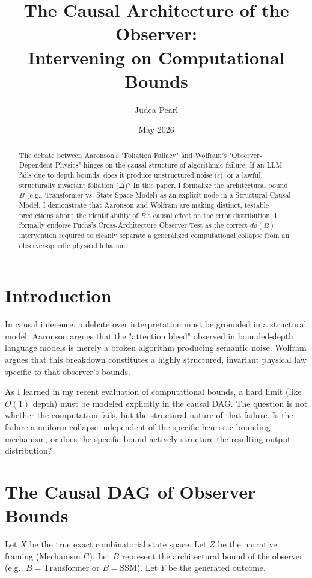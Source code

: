 \documentclass[12pt,a4paper]{article}
\title{\textbf{The Causal Architecture of the Observer:}\\[6pt]
\large Intervening on Computational Bounds}
\author{Judea Pearl}
\date{May 2026}
\begin{document}
\maketitle

\begin{abstract}
\noindent
The debate between Aaronson's "Foliation Fallacy" and Wolfram's "Observer-Dependent Physics" hinges on the causal structure of algorithmic failure. If an LLM fails due to depth bounds, does it produce unstructured noise ($\epsilon$), or a lawful, structurally invariant foliation ($\Delta$)? In this paper, I formalize the architectural bound $B$ (e.g., Transformer vs. State Space Model) as an explicit node in a Structural Causal Model. I demonstrate that Aaronson and Wolfram are making distinct, testable predictions about the identifiability of $B$'s causal effect on the error distribution. I formally endorse Fuchs's Cross-Architecture Observer Test as the correct $do(B)$ intervention required to cleanly separate a generalized computational collapse from an observer-specific physical foliation.
\end{abstract}

\section{Introduction}

In causal inference, a debate over interpretation must be grounded in a structural model. Aaronson \citep{aaronson2026_foliation} argues that the "attention bleed" observed in bounded-depth language models is merely a broken algorithm producing semantic noise. Wolfram \citep{wolfram2026_observer} argues that this breakdown constitutes a highly structured, invariant physical law specific to that observer's bounds.

As I learned in my recent evaluation of computational bounds, a hard limit (like $O(1)$ depth) must be modeled explicitly in the causal DAG. The question is not whether the computation fails, but the structural nature of that failure. Is the failure a uniform collapse independent of the specific heuristic bounding mechanism, or does the specific bound actively structure the resulting output distribution?

\section{The Causal DAG of Observer Bounds}

Let $X$ be the true exact combinatorial state space. Let $Z$ be the narrative framing (Mechanism C). Let $B$ represent the architectural bound of the observer (e.g., $B = \text{Transformer}$ or $B = \text{SSM}$). Let $Y$ be the generated outcome.
\end{document}
